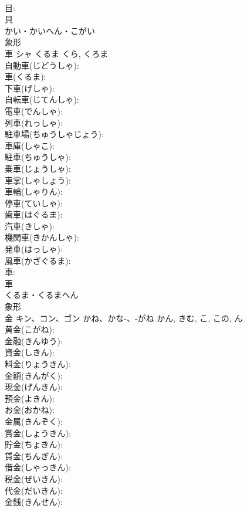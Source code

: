 \documentclass[8pt]{extreport}
\begin{document}
\begin{CJK}{UTF8}{min}
\\	目: 
\\	貝	
\\	かい・かいへん・こがい	
\\	象形 
\\	車	シャ	くるま	くら, くろま	
\\	自動車(じどうしゃ): 
\\	車(くるま): 
\\	下車(げしゃ): 
\\	自転車(じてんしゃ): 
\\	電車(でんしゃ): 
\\	列車(れっしゃ): 
\\	駐車場(ちゅうしゃじょう): 
\\	車庫(しゃこ): 
\\	駐車(ちゅうしゃ): 
\\	乗車(じょうしゃ): 
\\	車掌(しゃしょう): 
\\	車輪(しゃりん): 
\\	停車(ていしゃ): 
\\	歯車(はぐるま): 
\\	汽車(きしゃ): 
\\	機関車(きかんしゃ): 
\\	発車(はっしゃ): 
\\	風車(かざぐるま): 
\\	車: 
\\	車	
\\	くるま・くるまへん	
\\	象形 
\\	金	キン、コン、ゴン	かね、かな-、-がね	かん, きむ, こ, この, ん	
\\	黄金(こがね): 
\\	金融(きんゆう): 
\\	資金(しきん): 
\\	料金(りょうきん): 
\\	金額(きんがく): 
\\	現金(げんきん): 
\\	預金(よきん): 
\\	お金(おかね): 
\\	金属(きんぞく): 
\\	賞金(しょうきん): 
\\	貯金(ちょきん): 
\\	賃金(ちんぎん): 
\\	借金(しゃっきん): 
\\	税金(ぜいきん): 
\\	代金(だいきん): 
\\	金銭(きんせん): 

\end{CJK}
\end{document}
